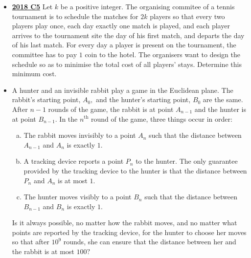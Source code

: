 \documentclass[11pt]{scrartcl}
\begin{document}
\begin{itemize}[leftmargin=*]
Three users $A$, $B$, and $C$ such that $A$ is friends with both $B$ and $C$, but $B$ and $C$ are not friends, change their friendship statuses such that $B$ and $C$ are now friends, but $A$ is no longer friends with $B$, and no longer friends with $C$. All other friendship statuses are unchanged.

Initially, $1010$ users have $1009$ friends each, and $1009$ users have $1010$ friends each. Prove that there exists a sequence of such events after which each user is friends with at most one other user.
    \item  \href{https://artofproblemsolving.com/community/c6h1876763p12752820}{\textbf{2018 C5}} Let $k$ be a positive integer. The organising commitee of a tennis tournament is to schedule the matches for $2k$ players so that every two players play once, each day exactly one match is played, and each player arrives to the tournament site the day of his first match, and departs the day of his last match. For every day a player is present on the tournament, the committee has to pay $1$ coin to the hotel. The organisers want to design the schedule so as to minimise the total cost of all players' stays. Determine this minimum cost.
    \item {} A hunter and an invisible rabbit play a game in the Euclidean plane. The rabbit's starting point, $A_0,$ and the hunter's starting point, $B_0$ are the same. After $n-1$ rounds of the game, the rabbit is at point $A_{n-1}$ and the hunter is at point $B_{n-1}.$ In the $n^{\text{th}}$ round of the game, three things occur in order:
    \begin{enumerate}[(a)]
        \item The rabbit moves invisibly to a point $A_n$ such that the distance between $A_{n-1}$ and $A_n$ is exactly $1.$
        \item A tracking device reports a point $P_n$ to the hunter. The only guarantee provided by the tracking device to the hunter is that the distance between $P_n$ and $A_n$ is at most $1.$
        \item The hunter moves visibly to a point $B_n$ such that the distance between $B_{n-1}$ and $B_n$ is exactly $1.$
    \end{enumerate}
Is it always possible, no matter how the rabbit moves, and no matter what points are reported by the tracking device, for the hunter to choose her moves so that after $10^9$ rounds, she can ensure that the distance between her and the rabbit is at most $100?$

\end{itemize}
\end{document}
